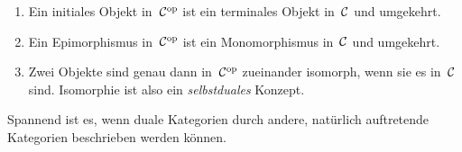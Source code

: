\begin{bsp}\begin{enumerate}
\item Ein initiales Objekt in~$\mathcal{C}^{\mathrm{op}}$ ist ein terminales Objekt in~$\mathcal{C}$ und
umgekehrt.
\item Ein Epimorphismus in~$\mathcal{C}^{\mathrm{op}}$ ist ein Monomorphismus in~$\mathcal{C}$ und
umgekehrt.
\item Zwei Objekte sind genau dann in~$\mathcal{C}^{\mathrm{op}}$ zueinander isomorph, wenn sie es
in~$\mathcal{C}$ sind. Isomorphie ist also ein \emph{selbstduales} Konzept.
\end{enumerate}\end{bsp}

Spannend ist es, wenn duale Kategorien durch andere, natürlich
auftretende Kategorien beschrieben werden können.

